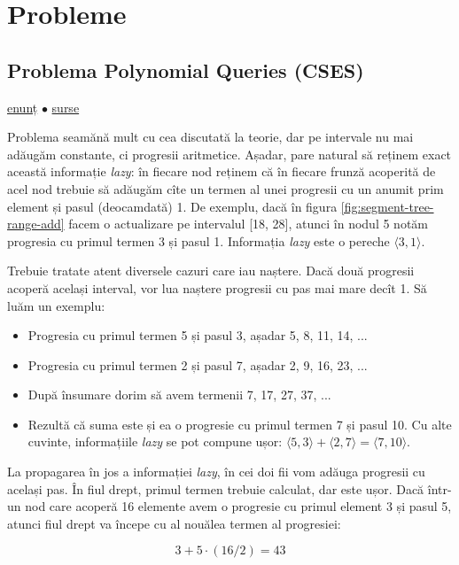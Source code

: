 \section{Probleme}

\subsection{Problema Polynomial Queries (CSES)}
\label{problem:polynomial-queries}

\href{https://cses.fi/problemset/task/1736}{enunț}
$\bullet$
\hyperref[code:polynomial-queries]{surse}

Problema seamănă mult cu cea discutată la teorie, dar pe intervale nu mai adăugăm constante, ci progresii aritmetice. Așadar, pare natural să reținem exact această informație \textit{lazy}: în fiecare nod reținem că în fiecare frunză acoperită de acel nod trebuie să adăugăm cîte un termen al unei progresii cu un anumit prim element și pasul (deocamdată) 1. De exemplu, dacă în figura \ref{fig:segment-tree-range-add} facem o actualizare pe intervalul [18, 28], atunci în nodul 5 notăm progresia cu primul termen 3 și pasul 1. Informația \textit{lazy} este o pereche $\langle 3,1 \rangle$.

Trebuie tratate atent diversele cazuri care iau naștere. Dacă două progresii acoperă același interval, vor lua naștere progresii cu pas mai mare decît 1. Să luăm un exemplu:

\begin{itemize}
  \item Progresia cu primul termen 5 și pasul 3, așadar 5, 8, 11, 14, ...
  \item Progresia cu primul termen 2 și pasul 7, așadar 2, 9, 16, 23, ...
  \item După însumare dorim să avem termenii 7, 17, 27, 37, ...
  \item Rezultă că suma este și ea o progresie cu primul termen 7 și pasul 10. Cu alte cuvinte, informațiile \textit{lazy} se pot compune ușor: $\langle 5,3 \rangle + \langle 2,7 \rangle = \langle 7,10 \rangle$.
\end{itemize}

La propagarea în jos a informației \textit{lazy}, în cei doi fii vom adăuga progresii cu același pas. În fiul drept, primul termen trebuie calculat, dar este ușor. Dacă într-un nod care acoperă 16 elemente avem o progresie cu primul element 3 și pasul 5, atunci fiul drept va începe cu al nouălea termen al progresiei:

$$3 + 5 \cdot (16/2) = 43$$

